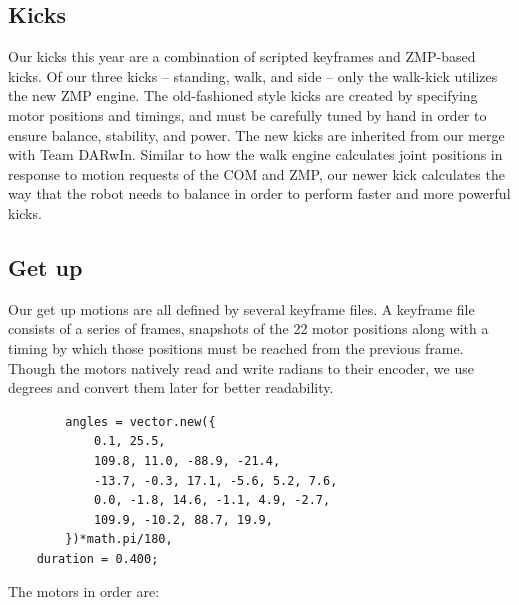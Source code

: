 \documentclass{article}
\begin{document}
\subsection{Kicks}
	  Our kicks this year are a combination of scripted keyframes and ZMP-based kicks. Of our three kicks -- standing, walk, and side -- only the walk-kick utilizes the new ZMP engine. The old-fashioned style kicks are created by specifying motor positions and timings, and must be carefully tuned by hand in order to ensure balance, stability, and power. The new kicks are inherited from our merge with Team DARwIn. Similar to how the walk engine calculates joint positions in response to motion requests of the COM and ZMP, our newer kick calculates the way that the robot needs to balance in order to perform faster and more powerful kicks.  

  
\subsection{Get up}
	Our get up motions are all defined by several keyframe files. A keyframe file consists of a series of frames, snapshots of the 22 motor positions along with a timing by which those positions must be reached from the previous frame. Though the motors natively read and write radians to their encoder, we use degrees and convert them later for better readability.
	
	\begin{lstlisting}
  	  	angles = vector.new({
	  		0.1, 25.5,
		  	109.8, 11.0, -88.9, -21.4,
  			-13.7, -0.3, 17.1, -5.6, 5.2, 7.6,
	  		0.0, -1.8, 14.6, -1.1, 4.9, -2.7,
		  	109.9, -10.2, 88.7, 19.9,
  	  	})*math.pi/180,
	duration = 0.400;
	\end{lstlisting}

  	The motors in order are:
\end{document}

